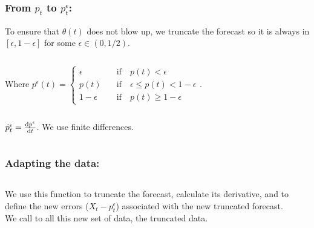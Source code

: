 \documentclass[aspectratio=169]{beamer}\usepackage[utf8]{inputenc}
\begin{document}
\begin{frame}\frametitle{From $p_t$ to $p_t^\epsilon$:}

To ensure that $\theta(t)$ does not blow up, we truncate the forecast so it is always in $[\epsilon,1-\epsilon]$ for some $\epsilon\in(0,1/2)$.

{\small
\begin{columns}[c]

Where $p^\epsilon(t)=\begin{cases}
\epsilon\quad&\text{if}\quad p(t)<\epsilon\\
p(t)\quad&\text{if}\quad \epsilon\leq p(t)<1-\epsilon\\
1-\epsilon\quad&\text{if}\quad p(t)\geq1-\epsilon
\end{cases}$.

\begin{center}
\begin{tabular}{|c|}
\toprule
{\tiny

}\\
\bottomrule
\end{tabular}
\end{center}

\end{columns}}

{\small
\begin{columns}[c]

$\dot{p}^\epsilon_t=\frac{\dif p^\epsilon}{\dif t}$. We use finite differences.

\begin{center}
\begin{tabular}{|c|}
\toprule
{\tiny

}\\
\bottomrule
\end{tabular}
\end{center}

\end{columns}}

\end{frame}


\begin{frame}\frametitle{Adapting the data:}

\begin{columns}[c]

We use this function to truncate the forecast, calculate its derivative, and to define the new errors ($X_t-p_t^\epsilon$) associated with the new truncated forecast.\\
We call to all this new set of data, the truncated data.

\begin{center}
\begin{tabular}{|c|}
\toprule
{\tiny

}\\
\bottomrule
\end{tabular}
\end{center}

\end{columns}

\end{frame}
\end{document}
